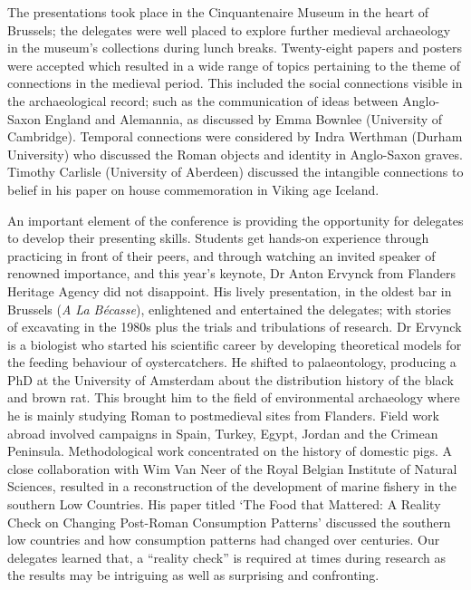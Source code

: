 \documentclass[%
	]{ijsra}
\begin{document}
The presentations took place in the Cinquantenaire Museum in the heart of Brussels; the delegates were well placed to explore further medieval archaeology in the museum’s collections during lunch breaks. Twenty-eight papers and posters were accepted which resulted in a wide range of topics pertaining to the theme of connections in the medieval period. This included the social connections visible in the archaeological record; such as the communication of ideas between Anglo-Saxon England and Alemannia, as discussed by Emma Bownlee (University of Cambridge). Temporal connections were considered by Indra Werthman (Durham University) who discussed the Roman objects and identity in Anglo-Saxon graves. Timothy Carlisle (University of Aberdeen) discussed the intangible connections to belief in his paper on house commemoration in Viking age Iceland. 

An important element of the conference is providing the opportunity for delegates to develop their presenting skills. Students get hands-on experience through practicing in front of their peers, and through watching an invited speaker of renowned importance, and this year’s keynote, Dr Anton Ervynck from Flanders Heritage Agency did not disappoint. His lively presentation, in the oldest bar in Brussels (\emph{A La Bécasse}), enlightened and entertained the delegates; with stories of excavating in the 1980s plus the trials and tribulations of research. Dr Ervynck is a biologist who started his scientific career by developing theoretical models for the feeding behaviour of oystercatchers. He shifted to palaeontology, producing a PhD at the University of Amsterdam about the distribution history of the black and brown rat. This brought him to the field of environmental archaeology where he is mainly studying Roman to postmedieval sites from Flanders. Field work abroad involved campaigns in Spain, Turkey, Egypt, Jordan and the Crimean Peninsula. Methodological work concentrated on the history of domestic pigs. A close collaboration with Wim Van Neer of the Royal Belgian Institute of Natural Sciences, resulted in a reconstruction of the development of marine fishery in the southern Low Countries. His paper titled ‘The Food that Mattered: A Reality Check on Changing Post-Roman Consumption Patterns’ discussed the southern low countries and how consumption patterns had changed over centuries. Our delegates learned that, a “reality check” is required at times during research as the results may be intriguing as well as surprising and confronting. 
\end{document}

